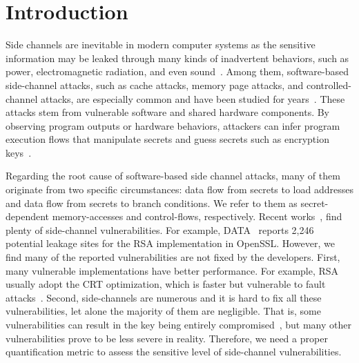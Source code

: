 \section{Introduction} 
Side channels are inevitable in modern computer systems as the sensitive
information may be leaked through many kinds of inadvertent behaviors, such as power,
electromagnetic radiation, and even
sound~\cite{agrawal2002side,kar20178,chari1999towards,217605,genkin2014rsa}.
Among them, software-based side-channel attacks, such as cache attacks, memory page
attacks, and controlled-channel attacks, are especially common and have been
studied for
years~\cite{7163052,217543,217589,lee2017inferring,191010,liu2015last}. These
attacks stem from vulnerable software and shared hardware components.
By observing program outputs or hardware behaviors, attackers can infer program
execution flows that manipulate secrets and guess secrets such as encryption
keys~\cite{Osvik2006,Gullasch:2011:CGB:2006077.2006784,203878,10.1007/978-3-540-45238-6_6}.


Regarding the root cause of software-based side channel attacks, many of them originate
from two specific circumstances: data flow from secrets to load
addresses and data flow from secrets to branch conditions. We refer to them as
secret-dependent memory-accesses and control-flows, respectively. 
Recent
works~\cite{203878,217537,Wichelmann:2018:MFF:3274694.3274741,Brotzman19Casym,236338,182946},
find plenty of side-channel vulnerabilities. For example,
DATA~\cite{217537} reports 2,246 potential leakage sites for the RSA
implementation in OpenSSL\@. 
However, we find many of the reported vulnerabilities are not fixed by the developers.
First, many vulnerable implementations have better performance. For example,
RSA usually adopt the CRT optimization,
which is faster but vulnerable to fault attacks~\cite{aumuller2002fault}.
Second, side-channels are numerous and it is hard to fix all these vulnerabilities,
let alone the majority of them are negligible. 
That is, some vulnerabilities can result in the key being 
entirely compromised~\cite{184415, aumuller2002fault}, 
but many other vulnerabilities prove to be less
severe in reality. Therefore, we need a proper quantification metric to 
assess the sensitive level of side-channel vulnerabilities.

